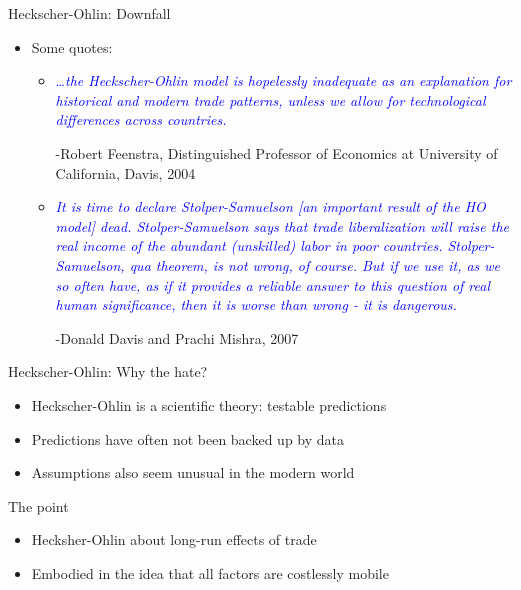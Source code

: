 \documentclass[ignorenonframetext,]{beamer}
\begin{document}
\begin{frame}{Heckscher-Ohlin: Downfall}

    \begin{itemize}
        \item Some quotes: 
            \begin{itemize}
                \item \textcolor{blue}{\dots \emph{the Heckscher-Ohlin model is hopelessly inadequate as an explanation for historical and modern trade patterns, unless we allow for technological differences across countries.} }

-Robert Feenstra, Distinguished Professor of Economics at University of California, Davis, 2004
                \item \textcolor{blue}{\emph{It is time to declare Stolper-Samuelson [an important result of the HO model] dead. Stolper-Samuelson says that trade liberalization will raise the real income of the abundant (unskilled) labor in poor countries.  Stolper-Samuelson, qua theorem, is not wrong, of course. But if we use it, as we so often have, as if it provides a reliable answer to this question of real human significance, then it is worse than wrong - it is dangerous.} }

-Donald Davis and Prachi Mishra, 2007
            \end{itemize}
            
    \end{itemize}

\end{frame}

\begin{frame}{Heckscher-Ohlin: Why the hate?}

    \begin{itemize}
        \item Heckscher-Ohlin is a scientific theory: testable predictions
        \item Predictions have often not been backed up by data
        \item Assumptions also seem unusual in the modern world
    \end{itemize}

\end{frame}

\begin{frame}{The point}

    \begin{itemize}
        \item Hecksher-Ohlin about long-run effects of trade
        \item Embodied in the idea that all factors are costlessly mobile
    \end{itemize}

\end{frame}
\end{document}

